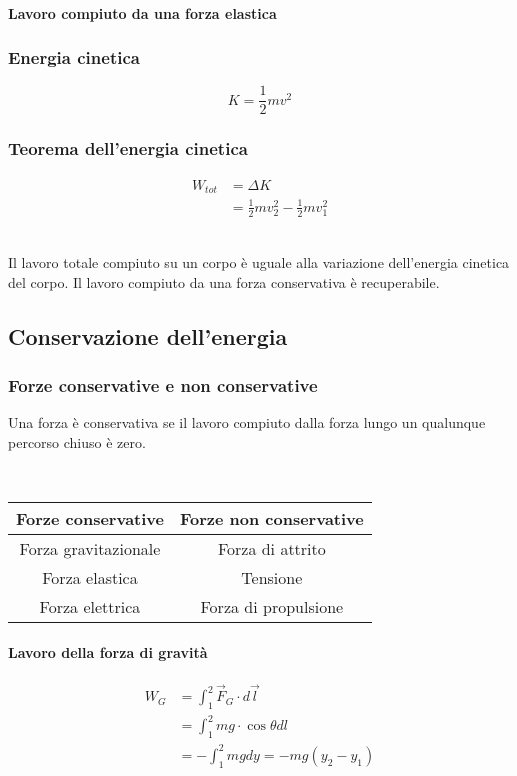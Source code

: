 \documentclass[a4paper,12pt]{article}
\theoremstyle{mystyle}
\begin{document}
\paragraph{Lavoro compiuto da una forza elastica}

\subsubsection{Energia cinetica}
\[K = \frac{1}{2}mv^2\]
\subsubsection{Teorema dell'energia cinetica}
\[\begin{aligned}
    W_{tot} &= \Delta K\\
    &= \frac{1}{2} m v_2^2- \frac{1}{2}mv_1^2
\end{aligned}\]\\
\parbox{0.8\textwidth}{
Il lavoro totale compiuto su un corpo è uguale alla variazione dell'energia cinetica del corpo.
Il lavoro compiuto da una forza conservativa è recuperabile.
}

\newpage


\subsection{Conservazione dell'energia}
\subsubsection{Forze conservative e non conservative}
\parbox{0.8\textwidth}{
Una forza è conservativa se il lavoro compiuto dalla forza lungo un qualunque percorso chiuso è zero.
}
\\

\begin{table}[h]
    \centering
    \begin{tabular}{|c|c|}
        \hline
        \textbf{Forze conservative} & \textbf{Forze non conservative} \\
        \hline
        Forza gravitazionale & Forza di attrito \\
        Forza elastica & Tensione \\
        Forza elettrica & Forza di propulsione \\
        \hline
    \end{tabular}
\end{table}


\paragraph{Lavoro della forza di gravità}
\[\begin{aligned}
    W_G &= \int_1^2 \vec F_G \cdot d \vec l\\
    &= \int_1^2 mg \cdot \cos \theta dl \\
    &=- \int_1^2 mg dy = -mg(y_2-y_1)
\end{aligned}\]
\end{document}
